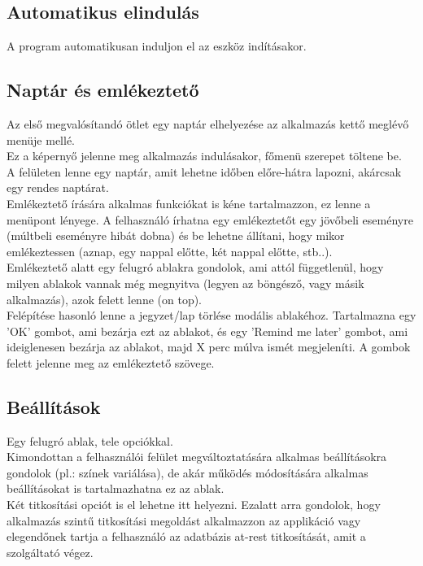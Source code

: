 \subsection{Automatikus elindulás}
A program automatikusan induljon el az eszköz indításakor.

\subsection{Naptár és emlékeztető}
Az első megvalósítandó ötlet egy naptár elhelyezése az alkalmazás kettő meglévő menüje mellé.
\\Ez a képernyő jelenne meg alkalmazás indulásakor, főmenü szerepet töltene be.
\vspace{5pt}\\A felületen lenne egy naptár, amit lehetne időben előre-hátra lapozni, akárcsak egy rendes naptárat.
\vspace{5pt}\\Emlékeztető írására alkalmas funkciókat is kéne tartalmazzon, ez lenne a menüpont lényege. A felhasználó írhatna egy emlékeztetőt egy jövőbeli eseményre (múltbeli eseményre hibát dobna) és be lehetne állítani, hogy mikor emlékeztessen (aznap, egy nappal előtte, két nappal előtte, stb..).
\vspace{5pt}\\Emlékeztető alatt egy felugró ablakra gondolok, ami attól függetlenül, hogy milyen ablakok vannak még megnyitva (legyen az böngésző, vagy másik alkalmazás), azok felett lenne (on top). 
\\Felépítése hasonló lenne a jegyzet/lap törlése modális ablakéhoz.
Tartalmazna egy 'OK' gombot, ami bezárja ezt az ablakot, és egy 'Remind me later' gombot, ami ideiglenesen bezárja az ablakot, majd X perc múlva ismét megjeleníti. A gombok felett jelenne meg az emlékeztető szövege.


\subsection{Beállítások}
Egy felugró ablak, tele opciókkal.
\\Kimondottan a felhasználói felület megváltoztatására alkalmas beállításokra gondolok (pl.: színek variálása), de akár működés	módosítására alkalmas beállításokat is tartalmazhatna ez az ablak.
\\Két titkosítási opciót is el lehetne itt helyezni. Ezalatt arra gondolok, hogy alkalmazás szintű titkosítási megoldást alkalmazzon az applikáció vagy elegendőnek tartja a felhasználó az adatbázis at-rest titkosítását, amit a szolgáltató végez.

